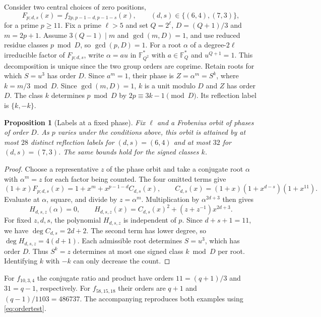 \documentclass[11pt]{article}
\newtheorem{proposition}{Proposition}[section]
\theoremstyle{definition}
\theoremstyle{remark}
\begin{document}
Consider two central choices of zero positions,
\[
 F_{p;d,s}(x)=f_{2p,p-1-d,p-1-s}(x),\qquad
 (d,s)\in\{(6,4),(7,3)\},
\]
for a prime $p\ge11$. Fix a prime $\ell>5$ and set
$Q=2^\ell$, $D=(Q+1)/3$ and $m=2p+1$. Assume
$3(Q-1)\mid m$ and $\gcd(m,D)=1$, and use reduced residue
classes $p\bmod D$, so $\gcd(p,D)=1$.
For a root $\alpha$ of a degree-$2\ell$ irreducible factor of
$F_{p;d,s}$, write $\alpha=a u$ in $\mathbb F_{Q^2}^*$ with
$a\in\mathbb F_Q^*$ and $u^{Q+1}=1$. This decomposition is
unique since the two group orders are coprime. Retain roots
for which $S=u^3$ has order $D$. Since $a^m=1$, their phase is
$Z=\alpha^m=S^k$, where $k=m/3\bmod D$. Since $\gcd(m,D)=1$, $k$ is a unit modulo $D$ and $Z$ has order $D$.
The class $k$ determines
$p\bmod D$ by $2p\equiv3k-1\pmod D$. Its reflection label is
$\{k,-k\}$.

\begin{proposition}[Labels at a fixed phase]\label{prop:fixed-phase-labels}
Fix $\ell$ and a Frobenius orbit of phases of order $D$. As $p$
varies under the conditions above, this orbit is attained by at most
$28$ distinct reflection labels for $(d,s)=(6,4)$ and at most
$32$ for $(d,s)=(7,3)$. The same bounds hold for the signed
classes $k$.
\end{proposition}
\begin{proof}
Choose a representative $z$ of the phase orbit and take a
conjugate root $\alpha$ with $\alpha^m=z$ for each factor
being counted. The four omitted terms give
\[
 (1+x)F_{p;d,s}(x)=1+x^m+x^{p-1-d}C_{d,s}(x),\qquad
 C_{d,s}(x)=(1+x)(1+x^{d-s})(1+x^{11}).
\]
Evaluate at $\alpha$, square, and divide by $z=\alpha^m$.
Multiplication by $\alpha^{2d+3}$ then gives
\[
 H_{d,s,z}(\alpha)=0,\qquad
 H_{d,s,z}(x)=C_{d,s}(x)^2+(z+z^{-1})x^{2d+3}.
\]
For fixed $z,d,s$, the polynomial $H_{d,s,z}$ is independent of $p$.
Since $d+s+1=11$, we have $\deg C_{d,s}=2d+2$. The second term
has lower degree, so $\deg H_{d,s,z}=4(d+1)$. Each admissible
root determines $S=u^3$, which has order $D$. Thus $S^k=z$
determines at most one signed class $k\bmod D$ per root.
Identifying $k$ with $-k$ can only decrease the count.
\end{proof}

For $f_{10,3,4}$ the conjugate ratio and product have orders
$11=(q+1)/3$ and $31=q-1$, respectively. For $f_{58,15,18}$ their
orders are $q+1$ and $(q-1)/1103=486737$. The accompanying
 reproduces both examples using \eqref{eq:ordertest}.
\end{document}
